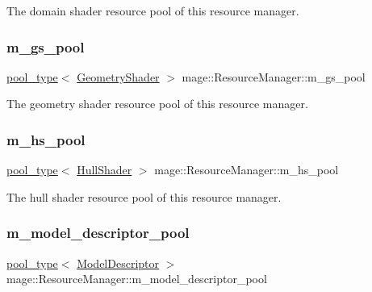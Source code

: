 The domain shader resource pool of this resource manager. \hypertarget{classmage_1_1_resource_manager_a8a1187e9291a442df598cdccd947432f}{}\label{classmage_1_1_resource_manager_a8a1187e9291a442df598cdccd947432f} 
\subsubsection{\texorpdfstring{m\+\_\+gs\+\_\+pool}{m\_gs\_pool}}
{\footnotesize\ttfamily \hyperlink{classmage_1_1_resource_manager_a4416f0a710790d8aa2d0bc006764695a}{pool\+\_\+type}$<$ \hyperlink{namespacemage_a0cf0bb4b74903e78658c96412d5687a6}{Geometry\+Shader} $>$ mage\+::\+Resource\+Manager\+::m\+\_\+gs\+\_\+pool\hspace{0.3cm}{\ttfamily [private]}}

The geometry shader resource pool of this resource manager. \hypertarget{classmage_1_1_resource_manager_aada8daa06b929bb23d2b0c2205a1573e}{}\label{classmage_1_1_resource_manager_aada8daa06b929bb23d2b0c2205a1573e} 
\subsubsection{\texorpdfstring{m\+\_\+hs\+\_\+pool}{m\_hs\_pool}}
{\footnotesize\ttfamily \hyperlink{classmage_1_1_resource_manager_a4416f0a710790d8aa2d0bc006764695a}{pool\+\_\+type}$<$ \hyperlink{namespacemage_a964e5e384b0e55ac900c819da48b6000}{Hull\+Shader} $>$ mage\+::\+Resource\+Manager\+::m\+\_\+hs\+\_\+pool\hspace{0.3cm}{\ttfamily [private]}}

The hull shader resource pool of this resource manager. \hypertarget{classmage_1_1_resource_manager_a6c79aeb11bed60bdf3e8420fddc72948}{}\label{classmage_1_1_resource_manager_a6c79aeb11bed60bdf3e8420fddc72948} 
\subsubsection{\texorpdfstring{m\+\_\+model\+\_\+descriptor\+\_\+pool}{m\_model\_descriptor\_pool}}
{\footnotesize\ttfamily \hyperlink{classmage_1_1_resource_manager_a4416f0a710790d8aa2d0bc006764695a}{pool\+\_\+type}$<$ \hyperlink{classmage_1_1_model_descriptor}{Model\+Descriptor} $>$ mage\+::\+Resource\+Manager\+::m\+\_\+model\+\_\+descriptor\+\_\+pool\hspace{0.3cm}{\ttfamily [private]}}


